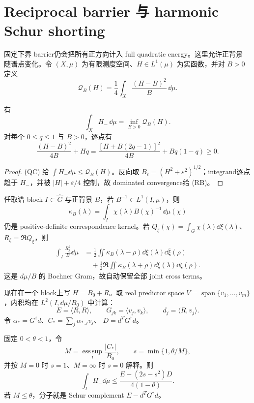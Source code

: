 \section{Reciprocal barrier 与 harmonic Schur shorting}

固定下界 barrier仍会把所有正方向计入 full quadratic energy。这里允许正背景
随谱点变化。令 $(X,\mu)$ 为有限测度空间、$H\in L^1(\mu)$ 为实函数，并对
$B>0$ 定义
\[
 \mathcal Q_B(H)=\frac14\int_X\frac{(H-B)^2}{B}\,\dd\mu.
\]

\begin{theorem}
\label{thm:reciprocal-barrier}
有
\[
 \int_XH_-\,\dd\mu=\inf_{B>0}\mathcal Q_B(H).    \tag{RB}
\]
对每个 $0\leq q\leq1$ 与 $B>0$，逐点有
\[
 \frac{(H-B)^2}{4B}+Hq
 =\frac{[H+B(2q-1)]^2}{4B}+Bq(1-q)\geq0.        \tag{QC}
\]
\end{theorem}

\begin{proof}
(QC) 给 $\int H_-\dd\mu\leq\mathcal Q_B(H)$。反向取
$B_\varepsilon=(H^2+\varepsilon^2)^{1/2}$；integrand逐点趋于 $H_-$，并被
$|H|+\varepsilon/4$ 控制，故 dominated convergence给 (RB)。
\end{proof}

任取谱 block $I\subset\widehat G$ 与正背景 $B$，若
$B^{-1}\in L^1(I,\mu)$，则
\[
 \kappa_B(\lambda)=\int_I\chi(\lambda)B(\chi)^{-1}\,\dd\mu(\chi) \tag{BK}
\]
仍是 positive-definite correspondence kernel。若
$Q_\xi(\chi)=\int_G\chi(\lambda)\dd\xi(\lambda)$、$R_\xi=\Re Q_\xi$，则
\begin{align*}
 \int_I\frac{R_\xi^2}{B}\dd\mu
 &=\frac12\iint\kappa_B(\lambda-\rho)
       \dd\xi(\lambda)\dd\overline\xi(\rho)\\
 &\quad+\frac12\Re\iint\kappa_B(\lambda+\rho)
       \dd\xi(\lambda)\dd\xi(\rho).           \tag{WG}
\end{align*}
这是 $d\mu/B$ 的 Bochner Gram，故自动保留全部 joint cross terms。

现在在一个 block上写 $H=B_0+R$。取 real predictor space
$V=\operatorname{span}\{v_1,\ldots,v_m\}$，内积均在
$L^2(I,\dd\mu/B_0)$ 中计算：
\[
 E=\langle R,R\rangle,\qquad
 G_{jk}=\langle v_j,v_k\rangle,\qquad
 d_j=\langle R,v_j\rangle.
\]
令 $\alpha_*=G^\dagger d$、$C_*=\sum_j\alpha_{*,j}v_j$、
$D=d^TG^\dagger d$。

\begin{theorem}
\label{thm:harmonic-schur}
固定 $0<\theta<1$，令
\[
 M=\operatorname*{ess\,sup}_I\frac{|C_*|}{B_0},\qquad
 s=\min\{1,\theta/M\},
\]
并按 $M=0$ 时 $s=1$、$M=\infty$ 时 $s=0$ 解释。则
\[
 \int_IH_-\dd\mu\leq
 \frac{E-(2s-s^2)D}{4(1-\theta)}.               \tag{HS}
\]
若 $M\leq\theta$，分子就是 Schur complement
$E-d^TG^\dagger d$。
\end{theorem}

